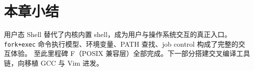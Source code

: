 \section{本章小结}

用户态 Shell 替代了内核内置 shell，成为用户与操作系统交互的真正入口。
\texttt{fork+exec} 命令执行模型、环境变量、PATH 查找、job control 构成了完整的交互体验。
至此里程碑 F（POSIX 兼容层）全部完成。下一部分搭建交叉编译工具链，向移植 GCC 与 Vim 进发。
